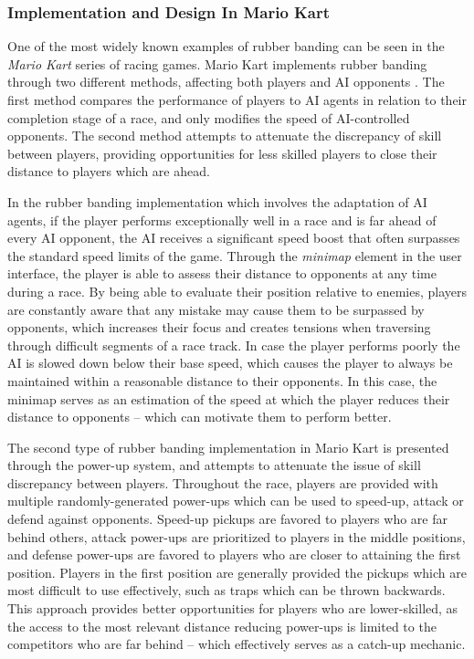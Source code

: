 \subsubsection{Implementation and Design In Mario Kart}

One of the most widely known examples of rubber banding can be seen in the \emph{Mario Kart} series of racing games. Mario Kart implements rubber banding through two different methods, affecting both players and AI opponents \cite{website_rubberbandingmariokart}. The first method compares the performance of players to AI agents in relation to their completion stage of a race, and only modifies the speed of AI-controlled opponents. The second method attempts to attenuate the discrepancy of skill between players, providing opportunities for less skilled players to close their distance to players which are ahead.

In the rubber banding implementation which involves the adaptation of AI agents, if the player performs exceptionally well in a race and is far ahead of every AI opponent, the AI receives a significant speed boost that often surpasses the standard speed limits of the game. Through the \emph{minimap} element in the user interface, the player is able to assess their distance to opponents at any time during a race. By being able to evaluate their position relative to enemies, players are constantly aware that any mistake may cause them to be surpassed by opponents, which increases their focus and creates tensions when traversing through difficult segments of a race track. In case the player performs poorly the AI is slowed down below their base speed, which causes the player to always be maintained within a reasonable distance to their opponents. In this case, the minimap serves as an estimation of the speed at which the player reduces their distance to opponents -- which can motivate them to perform better.

The second type of rubber banding implementation in Mario Kart is presented through the power-up system, and attempts to attenuate the issue of skill discrepancy between players. Throughout the race, players are provided with multiple randomly-generated power-ups which can be used to speed-up, attack or defend against opponents. Speed-up pickups are favored to players who are far behind others, attack power-ups are prioritized to players in the middle positions, and defense power-ups are favored to players who are closer to attaining the first position. Players in the first position are generally provided the pickups which are most difficult to use effectively, such as traps which can be thrown backwards. This approach provides better opportunities for players who are lower-skilled, as the access to the most relevant distance reducing power-ups is limited to the competitors who are far behind -- which effectively serves as a catch-up mechanic.

